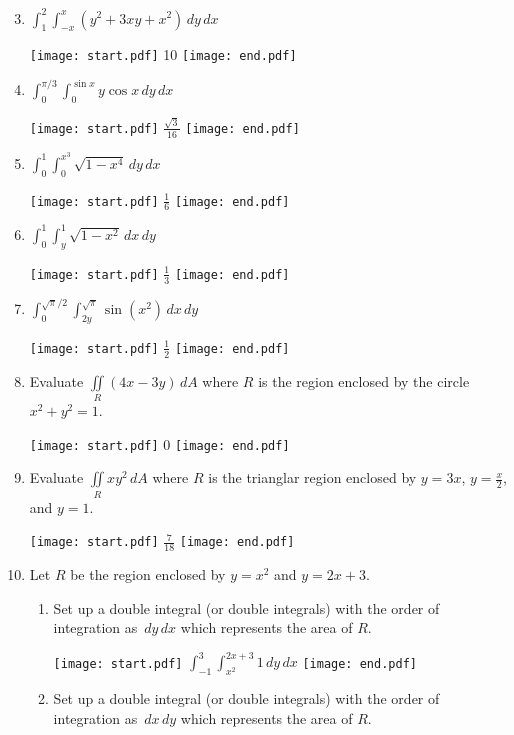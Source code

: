 \documentclass[12pt]{article}
\begin{document}
\begin{enumerate}
\setcounter{enumi}{2}
\item $\int_1^2 \int_{-x}^x \left(y^2+3xy+x^2\right) \,dy \,dx$

\texttt{[image: start.pdf]}
{{10}}
\texttt{[image: end.pdf]}


\item $\int_0^{\pi/3} \int_0^{\sin{x}} y\cos{x}\,dy\,dx$

\texttt{[image: start.pdf]}
{{$\frac{\sqrt{3}}{16}$}}
\texttt{[image: end.pdf]}


\item $\int_0^1 \int_0^{x^3} \sqrt{1-x^4} \,dy \,dx$

\texttt{[image: start.pdf]}
{{$\frac{1}{6}$}}
\texttt{[image: end.pdf]}


\item $\int_0^1 \int_y^1 \sqrt{1-x^2} \,dx \,dy$

\texttt{[image: start.pdf]}
{{$\frac{1}{3}$}}
\texttt{[image: end.pdf]}


\item $\int_0^{\sqrt{\pi}/2} \int_{2y}^{\sqrt{\pi}} \sin{\left(x^2\right)}\,dx \,dy$

\texttt{[image: start.pdf]}
{{$\frac{1}{2}$}}
\texttt{[image: end.pdf]}


\item Evaluate $\iint \limits_{R} \left(4x-3y\right) \,dA$ where $R$ is the region enclosed by the circle $x^2+y^2=1$.

\texttt{[image: start.pdf]}
{{0}}
\texttt{[image: end.pdf]}


\item Evaluate $\iint \limits_{R} xy^2 \,dA$ where $R$ is the trianglar region enclosed by $y=3x$, $y=\frac{x}{2}$, and $y=1$.

\texttt{[image: start.pdf]}
{{$\frac{7}{18}$}}
\texttt{[image: end.pdf]}


\item Let $R$ be the region enclosed by $y=x^2$ and $y=2x+3$.

\begin{enumerate}

\item Set up a double integral (or double integrals) with the order of integration as $\,dy\,dx$ which represents the area of $R$.

\texttt{[image: start.pdf]}
{{$\int_{-1}^3 \int_{x^2}^{2x+3} 1 \,dy\,dx$}}
\texttt{[image: end.pdf]}


\item Set up a double integral (or double integrals) with the order of integration as $\,dx\,dy$ which represents the area of $R$.


\end{enumerate}
\end{enumerate}
\end{document}
